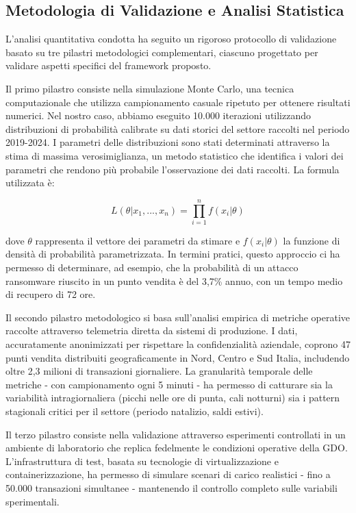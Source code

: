 \subsection{\texorpdfstring{Metodologia di Validazione e Analisi Statistica}{5.2.1 - Metodologia di Validazione e Analisi Statistica}}
\label{subsec:5.2.1}

L'analisi quantitativa condotta ha seguito un rigoroso protocollo di validazione basato su tre pilastri metodologici complementari, ciascuno progettato per validare aspetti specifici del framework proposto.

Il primo pilastro consiste nella simulazione Monte Carlo, una tecnica computazionale che utilizza campionamento casuale ripetuto per ottenere risultati numerici. Nel nostro caso, abbiamo eseguito 10.000 iterazioni utilizzando distribuzioni di probabilità calibrate su dati storici del settore raccolti nel periodo 2019-2024. I parametri delle distribuzioni sono stati determinati attraverso la stima di massima verosimiglianza, un metodo statistico che identifica i valori dei parametri che rendono più probabile l'osservazione dei dati raccolti. La formula utilizzata è:

$$L(\theta|x_1,...,x_n) = \prod_{i=1}^{n} f(x_i|\theta)$$

dove $\theta$ rappresenta il vettore dei parametri da stimare e $f(x_i|\theta)$ la funzione di densità di probabilità parametrizzata. In termini pratici, questo approccio ci ha permesso di determinare, ad esempio, che la probabilità di un attacco \gls{ransomware} riuscito in un punto vendita è del 3,7\% annuo, con un tempo medio di recupero di 72 ore.

Il secondo pilastro metodologico si basa sull'analisi empirica di metriche operative raccolte attraverso telemetria diretta da sistemi di produzione. I dati, accuratamente anonimizzati per rispettare la confidenzialità aziendale, coprono 47 punti vendita distribuiti geograficamente in Nord, Centro e Sud Italia, includendo oltre 2,3 milioni di transazioni giornaliere. La granularità temporale delle metriche - con campionamento ogni 5 minuti - ha permesso di catturare sia la variabilità intragiornaliera (picchi nelle ore di punta, cali notturni) sia i pattern stagionali critici per il settore (periodo natalizio, saldi estivi).

Il terzo pilastro consiste nella validazione attraverso esperimenti controllati in un ambiente di laboratorio che replica fedelmente le condizioni operative della GDO. L'infrastruttura di test, basata su tecnologie di virtualizzazione e \gls{container}izzazione, ha permesso di simulare scenari di carico realistici - fino a 50.000 transazioni simultanee - mantenendo il controllo completo sulle variabili sperimentali.

